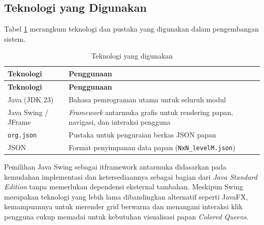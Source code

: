 \subsection{Teknologi yang Digunakan}
\label{subsec:teknologi}

Tabel \ref{tab:teknologi} merangkum teknologi dan pustaka yang digunakan dalam pengembangan sistem.

\begin{longtable}{lp{9cm}}
	\caption{Teknologi yang digunakan}
	\label{tab:teknologi} \\
	\toprule
	\textbf{Teknologi} & \textbf{Penggunaan} \\
	\midrule
	\endfirsthead
	\toprule
	\textbf{Teknologi} & \textbf{Penggunaan} \\
	\midrule
	\endhead
	\bottomrule
	\endfoot
	Java (JDK 23) & Bahasa pemrograman utama untuk seluruh modul \\
	\midrule
	Java Swing / JFrame & \textit{Framework} antarmuka grafis untuk rendering papan, navigasi, dan interaksi pengguna \\
	\midrule
	\texttt{org.json} & Pustaka untuk penguraian berkas JSON papan \\
	\midrule
	JSON & Format penyimpanan data papan (\texttt{NxN\_levelM.json}) \\
	\bottomrule
\end{longtable}

Pemilihan Java Swing sebagai \text it{framework} antarmuka didasarkan pada kemudahan implementasi dan ketersediaannya sebagai bagian dari \textit{Java Standard Edition} tanpa memerlukan dependensi eksternal tambahan. Meskipun Swing merupakan teknologi yang lebih lama dibandingkan alternatif seperti JavaFX, kemampuannya untuk merender grid berwarna dan menangani interaksi klik pengguna cukup memadai untuk kebutuhan visualisasi papan \textit{Colored Queens}.